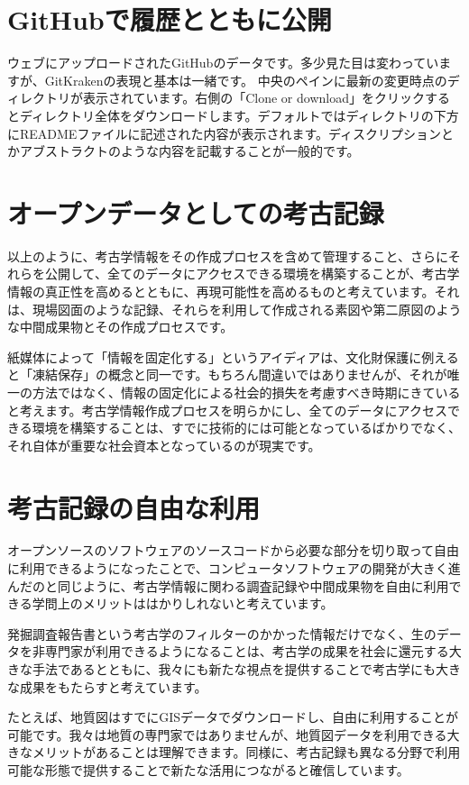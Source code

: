 \documentclass[14Q]{jsarticle}
\begin{document}
\section{GitHubで履歴とともに公開}
ウェブにアップロードされたGitHubのデータです。多少見た目は変わっていますが、GitKrakenの表現と基本は一緒です。
中央のペインに最新の変更時点のディレクトリが表示されています。右側の「Clone or download」をクリックするとディレクトリ全体をダウンロードします。デフォルトではディレクトリの下方にREADMEファイルに記述された内容が表示されます。ディスクリプションとかアブストラクトのような内容を記載することが一般的です。

\section{オープンデータとしての考古記録}

以上のように、考古学情報をその作成プロセスを含めて管理すること、さらにそれらを公開して、全てのデータにアクセスできる環境を構築することが、考古学情報の真正性を高めるとともに、再現可能性を高めるものと考えています。それは、現場図面のような記録、それらを利用して作成される素図や第二原図のような中間成果物とその作成プロセスです。

紙媒体によって「情報を固定化する」というアイディアは、文化財保護に例えると「凍結保存」の概念と同一です。もちろん間違いではありませんが、それが唯一の方法ではなく、情報の固定化による社会的損失を考慮すべき時期にきていると考えます。考古学情報作成プロセスを明らかにし、全てのデータにアクセスできる環境を構築することは、すでに技術的には可能となっているばかりでなく、それ自体が重要な社会資本となっているのが現実です。

\section{考古記録の自由な利用}
オープンソースのソフトウェアのソースコードから必要な部分を切り取って自由に利用できるようになったことで、コンピュータソフトウェアの開発が大きく進んだのと同じように、考古学情報に関わる調査記録や中間成果物を自由に利用できる学問上のメリットははかりしれないと考えています。

発掘調査報告書という考古学のフィルターのかかった情報だけでなく、生のデータを非専門家が利用できるようになることは、考古学の成果を社会に還元する大きな手法であるとともに、我々にも新たな視点を提供することで考古学にも大きな成果をもたらすと考えています。

たとえば、地質図はすでにGISデータでダウンロードし、自由に利用することが可能です。我々は地質の専門家ではありませんが、地質図データを利用できる大きなメリットがあることは理解できます。同様に、考古記録も異なる分野で利用可能な形態で提供することで新たな活用につながると確信しています。
\end{document}

